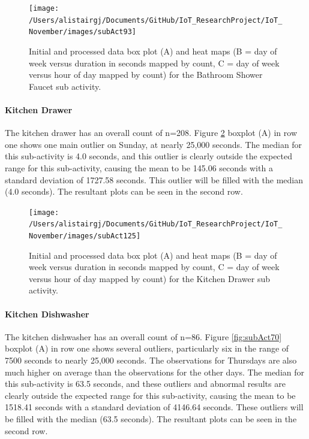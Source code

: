 \documentclass[11pt,]{article}
\let\oldparagraph\paragraph
\renewcommand{\paragraph}[1]{\oldparagraph{#1}\mbox{}}
\begin{document}
\begin{figure}[H]

{\centering \texttt{[image: /Users/alistairgj/Documents/GitHub/IoT\_ResearchProject/IoT\_November/images/subAct93]} 

}

\caption{Initial and processed data box plot (A) and heat maps (B = day of week versus duration in seconds mapped by count, C = day of week versus hour of day mapped by count) for the Bathroom Shower Faucet sub activity.}\label{fig:subAct93}
\end{figure}

\hypertarget{kitchen-drawer}{%
\paragraph{Kitchen Drawer}\label{kitchen-drawer}}

The kitchen drawer has an overall count of n=208. Figure
\ref{fig:subAct125} boxplot (A) in row one shows one main outlier on
Sunday, at nearly 25,000 seconds. The median for this sub-activity is
4.0 seconds, and this outlier is clearly outside the expected range for
this sub-activity, causing the mean to be 145.06 seconds with a standard
deviation of 1727.58 seconds. This outlier will be filled with the
median (4.0 seconds). The resultant plots can be seen in the second row.

\begin{figure}[H]

{\centering \texttt{[image: /Users/alistairgj/Documents/GitHub/IoT\_ResearchProject/IoT\_November/images/subAct125]} 

}

\caption{Initial and processed data box plot (A) and heat maps (B = day of week versus duration in seconds mapped by count, C = day of week versus hour of day mapped by count) for the Kitchen Drawer sub activity.}\label{fig:subAct125}
\end{figure}

\hypertarget{kitchen-dishwasher}{%
\paragraph{Kitchen Dishwasher}\label{kitchen-dishwasher}}

The kitchen dishwasher has an overall count of n=86. Figure
\ref{fig:subAct70} boxplot (A) in row one shows several outliers,
particularly six in the range of 7500 seconds to nearly 25,000 seconds.
The observations for Thursdays are also much higher on average than the
observations for the other days. The median for this sub-activity is
63.5 seconds, and these outliers and abnormal results are clearly
outside the expected range for this sub-activity, causing the mean to be
1518.41 seconds with a standard deviation of 4146.64 seconds. These
outliers will be filled with the median (63.5 seconds). The resultant
plots can be seen in the second row.
\end{document}
